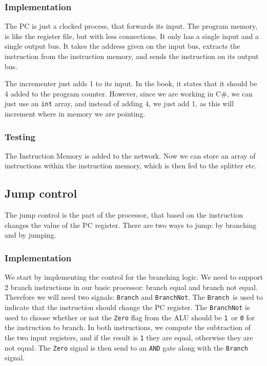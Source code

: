 \subsubsection*{Implementation}
The PC is just a clocked process, that forwards its input. The program memory,
is like the register file, but with less connections. It only has a single
input and a single output bus. It takes the address given on the input bus,
extracts the instruction from the instruction memory, and sends the instruction
on its output bus.

The incrementer just adds 1 to its input. In the book, it states that it should
be 4 added to the program counter. However, since we are working in C\#, we can
just use an \texttt{int} array, and instead of adding 4, we just add 1, as this
will increment where in memory we are pointing.

\subsubsection*{Testing}
The Instruction Memory is added to the network. Now we can store an array of
instructions within the instruction memory, which is then fed to the splitter
etc.

\subsection{Jump control}
The jump control is the part of the processor, that based on the instruction
changes the value of the PC register. There are two ways to jump: by branching
and by jumping.

\subsubsection*{Implementation}
We start by implementing the control for the branching logic. We need to
support 2 branch instructions in our basic processor: branch equal and branch
not equal. Therefore we will need two signals: \texttt{Branch} and
\texttt{BranchNot}. The \texttt{Branch} is used to indicate that the
instruction should change the PC register. The \texttt{BranchNot} is used to
choose whether or not the \texttt{Zero} flag from the ALU should be
\texttt{1} or \texttt{0} for the instruction to branch. In both instructions,
we compute the subtraction of the two input registers, and if the result is
\texttt{1} they are equal, otherwise they are not equal. The \texttt{Zero}
signal is then send to an \texttt{AND} gate along with the \texttt{Branch}
signal.

